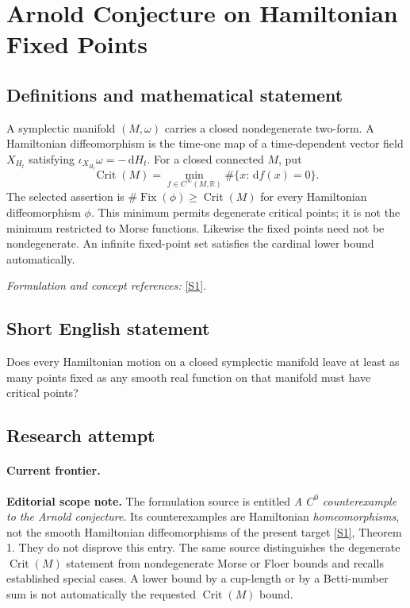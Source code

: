 \documentclass[11pt,a4paper]{article}
\newcommand{\R}{\mathbb{R}}
\newcommand{\dd}{\,\mathrm d}
\newcommand{\sref}[2]{\hyperlink{source:#1:#2}{[S#2]}}
\newif\ifshowcatalogue
\newcommand{\cataloguescope}[1]{\ifshowcatalogue
 \paragraph{Exact scope in the supplied catalogue.}
 \begin{quote}\small #1\end{quote}\fi}
\numberwithin{equation}{section}
\begin{document}
\setcounter{section}{0}
\clearpage
\section*{\texorpdfstring{Arnold Conjecture on Hamiltonian Fixed Points}{Arnold Conjecture on Hamiltonian Fixed Points}}\label{statement}
\subsection{Definitions and mathematical statement}
A symplectic manifold $(M,\omega)$ carries a closed nondegenerate two-form. A Hamiltonian diffeomorphism is the time-one map of a time-dependent vector field $X_{H_t}$ satisfying $\iota_{X_{H_t}}\omega=-\dd H_t$. For a closed connected $M$, put
\[
 \operatorname{Crit}(M)=\min_{f\in C^\infty(M,\R)}\#\{x:\dd f(x)=0\}.
\]
The selected assertion is $\#\operatorname{Fix}(\phi)\ge\operatorname{Crit}(M)$ for every Hamiltonian diffeomorphism $\phi$. This minimum permits degenerate critical points; it is not the minimum restricted to Morse functions. Likewise the fixed points need not be nondegenerate. An infinite fixed-point set satisfies the cardinal lower bound automatically.
\par\smallskip\textit{Formulation and concept references:} \sref{statement}{1}.
\cataloguescope{Prove that every Hamiltonian diffeomorphism of an arbitrary closed connected symplectic manifold has at least Crit(M) fixed points, where Crit(M) is the minimum number of critical points of a smooth function on M.}
\subsection{Short English statement}
Does every Hamiltonian motion on a closed symplectic manifold leave at least as many points fixed as any smooth real function on that manifold must have critical points?
\subsection{Research attempt}

\paragraph{Current frontier.}
\textbf{Editorial scope note.} The formulation source is entitled
\emph{A $C^0$ counterexample to the Arnold conjecture}. Its counterexamples
are Hamiltonian \emph{homeomorphisms}, not the smooth Hamiltonian
diffeomorphisms of the present target \sref{statement}{1}, Theorem 1. They do
not disprove this entry. The same source distinguishes the degenerate
$\operatorname{Crit}(M)$ statement from nondegenerate Morse or Floer
bounds and recalls established special cases. A lower bound by a cup-length
or by a Betti-number sum is not automatically the requested
$\operatorname{Crit}(M)$ bound.
\end{document}
